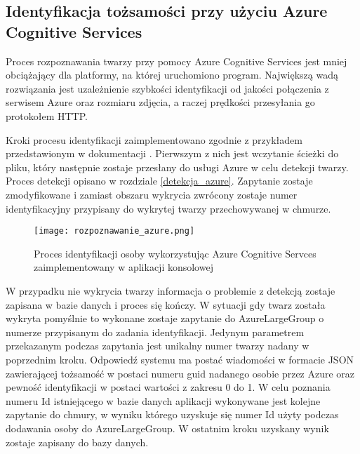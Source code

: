 \subsection{Identyfikacja tożsamości przy użyciu Azure Cognitive Services}\label{s:identyfikacja_azure}
Proces rozpoznawania twarzy przy pomocy Azure Cognitive Services jest mniej obciążający dla platformy, na której uruchomiono program. Największą wadą rozwiązania jest uzależnienie szybkości identyfikacji od jakości połączenia z serwisem Azure oraz rozmiaru zdjęcia, a raczej prędkości przesyłania go protokołem HTTP.

Kroki procesu identyfikacji zaimplementowano zgodnie z przykładem przedstawionym w dokumentacji \cite{acs_doc}. Pierwszym z nich jest wczytanie ścieżki do pliku, który następnie zostaje przesłany do usługi Azure w celu detekcji twarzy. Proces detekcji opisano w rozdziale \ref{detekcja_azure}. Zapytanie zostaje zmodyfikowane i zamiast obszaru wykrycia zwrócony zostaje numer identyfikacyjny przypisany do wykrytej twarzy przechowywanej w chmurze.
\begin{figure}[H]
	\centering
	\texttt{[image: rozpoznawanie\_azure.png]}
	\caption{Proces identyfikacji osoby wykorzystując Azure Cognitive Servces zaimplementowany w aplikacji konsolowej}
	\label{fig:rozpoznawanie_azure}
\end{figure}
W przypadku nie wykrycia twarzy informacja o problemie z detekcją zostaje zapisana w bazie danych i proces się kończy. W sytuacji gdy twarz została wykryta pomyślnie to wykonane zostaje zapytanie do AzureLargeGroup o numerze przypisanym do zadania identyfikacji. Jedynym parametrem przekazanym podczas zapytania jest unikalny numer twarzy nadany w poprzednim kroku. Odpowiedź systemu ma postać wiadomości w formacie JSON zawierającej tożsamość w postaci numeru guid nadanego osobie przez Azure oraz pewność identyfikacji w postaci wartości z zakresu 0 do 1. W celu poznania numeru Id istniejącego w bazie danych aplikacji wykonywane jest kolejne zapytanie do chmury, w wyniku którego uzyskuje się numer Id użyty podczas dodawania osoby do AzureLargeGroup. W ostatnim kroku uzyskany wynik zostaje zapisany do bazy danych.



